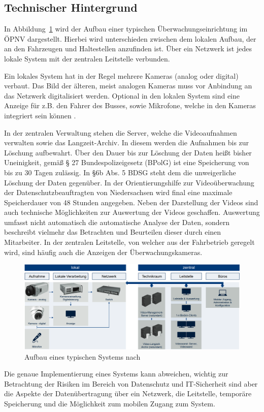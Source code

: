 \newpage
\subsection{Technischer Hintergrund}
\label{abschnitt:technisch}
In Abbildung~\ref{fig:architektur} wird der Aufbau einer typischen Überwachungseinrichtung im ÖPNV dargestellt. Hierbei wird unterschieden zwischen dem lokalen Aufbau, der an den Fahrzeugen und Haltestellen
anzufinden ist. Über ein Netzwerk ist jedes lokale System mit der zentralen Leitstelle verbunden.

Ein lokales System hat in der Regel mehrere Kameras (analog oder digital) verbaut. Das Bild der älteren, meist analogen Kameras muss vor Anbindung an das Netzwerk digitalisiert werden.
Optional in den lokalen System sind eine Anzeige für z.B. den Fahrer des Busses, sowie Mikrofone, welche in den Kameras integriert sein können \cite{Reuter.12.02.2019}.

In der zentralen Verwaltung stehen die Server, welche die Videoaufnahmen verwalten sowie das \glqq{}Langzeit-Archiv\grqq{}. In diesem werden die Aufnahmen bis zur Löschung aufbewahrt.
Über den Dauer bis zur Löschung der Daten heißt bisher Uneinigkeit, gemäß § 27 Bundespolizeigesetz (BPolG) ist eine Speicherung von bis zu 30 Tagen zulässig. In  §6b Abs. 5 BDSG
steht dem die unweigerliche Löschung der Daten gegenüber. In der \glqq{}Orientierungshilfe zur Videoüberwachung\grqq{} der Datenschutzbeauftragten von Niedersachsen wird final eine maximale
Speicherdauer von 48 Stunden angegeben\cite{DanielaWindelband.20.April2016}. Neben der Darstellung der Videos sind auch technische Möglichkeiten zur Auswertung der Videos geschaffen.
Auswertung umfasst nicht automatisch die automatische Analyse der Daten, sondern beschreibt vielmehr das Betrachten und Beurteilen dieser durch einen Mitarbeiter. In der zentralen Leitstelle, von welcher aus der
Fahrbetrieb geregelt wird, sind häufig auch die Anzeigen der Überwachungskameras.
\begin{figure}[ht]
    \begin{center}
        \includegraphics[width= 1\textwidth]{Bilder/architektur.png}
        \caption{Aufbau eines typischen Systems nach \cite{LandesbeauftragtefurdenDatenschutzBadenWurttemberg.2015}}
        \label{fig:architektur}
    \end{center}
\end{figure}

Die genaue Implementierung eines Systems kann abweichen, wichtig zur Betrachtung der Risiken im Bereich von Datenschutz und IT-Sicherheit
sind aber die Aspekte der Datenübertragung über ein Netzwerk, die Leitstelle, temporäre Speicherung und die Möglichkeit zum mobilen Zugang zum System.
